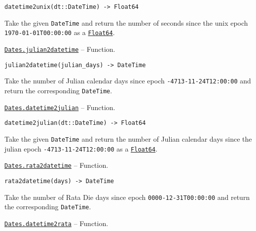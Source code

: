 \begin{adjustwidth}{2em}{0pt}


\begin{verbatim}
datetime2unix(dt::DateTime) -> Float64
\end{verbatim}

Take the given \texttt{DateTime} and return the number of seconds since the unix epoch \texttt{1970-01-01T00:00:00} as a \hyperlink{5027751419500983000}{\texttt{Float64}}.



\end{adjustwidth}
\hypertarget{2031899596964007680}{}
\hyperlink{2031899596964007680}{\texttt{Dates.julian2datetime}}  -- {Function.}

\begin{adjustwidth}{2em}{0pt}


\begin{verbatim}
julian2datetime(julian_days) -> DateTime
\end{verbatim}

Take the number of Julian calendar days since epoch \texttt{-4713-11-24T12:00:00} and return the corresponding \texttt{DateTime}.



\end{adjustwidth}
\hypertarget{11675145653043813028}{}
\hyperlink{11675145653043813028}{\texttt{Dates.datetime2julian}}  -- {Function.}

\begin{adjustwidth}{2em}{0pt}


\begin{verbatim}
datetime2julian(dt::DateTime) -> Float64
\end{verbatim}

Take the given \texttt{DateTime} and return the number of Julian calendar days since the julian epoch \texttt{-4713-11-24T12:00:00} as a \hyperlink{5027751419500983000}{\texttt{Float64}}.



\end{adjustwidth}
\hypertarget{13618878841813439465}{}
\hyperlink{13618878841813439465}{\texttt{Dates.rata2datetime}}  -- {Function.}

\begin{adjustwidth}{2em}{0pt}


\begin{verbatim}
rata2datetime(days) -> DateTime
\end{verbatim}

Take the number of Rata Die days since epoch \texttt{0000-12-31T00:00:00} and return the corresponding \texttt{DateTime}.



\end{adjustwidth}
\hypertarget{4095235562821247460}{}
\hyperlink{4095235562821247460}{\texttt{Dates.datetime2rata}}  -- {Function.}

